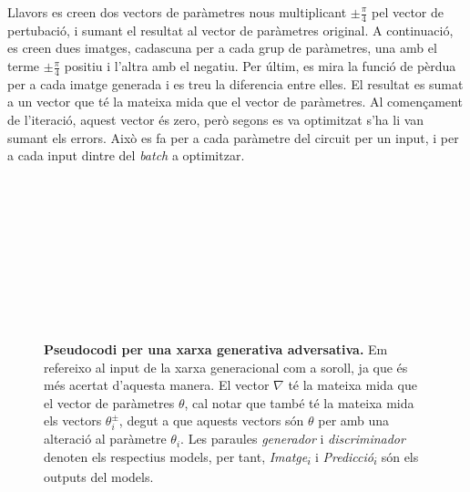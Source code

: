 Llavors es creen dos vectors de paràmetres nous multiplicant $\pm\frac{\pi}{4}$ pel vector de pertubació, i sumant el resultat al vector de paràmetres original. A continuació, es creen dues imatges, cadascuna per a cada grup de paràmetres, una amb el terme $\pm\frac{\pi}{4}$ positiu i l'altra amb el negatiu. Per últim, es mira la funció de pèrdua per a cada imatge generada i es treu la diferencia entre elles. El resultat es sumat a un vector que té la mateixa mida que el vector de paràmetres. Al començament de l'iteració, aquest vector és zero, però segons es va optimitzat s'ha li van sumant els errors. Això es fa per a cada paràmetre del circuit per un input, i per a cada input dintre del \textit{batch} a optimitzar.
\begin{figure}
	\HRule \\[-.5cm]
	\begin{algorithmic}
		 
		 
		\\
		 
		\\
		 	 
		\\
		\\
		 
		\EndFor
		\EndFor
		\\
		 
		 
		\EndFor
	\end{algorithmic}
	\HRule \\[-.4cm]
	\caption{\textbf{Pseudocodi per una xarxa generativa adversativa.} Em refereixo al input de la xarxa generacional com a soroll, ja que és més acertat d'aquesta manera. El vector $\nabla$ té la mateixa mida que el vector de paràmetres $\theta$, cal notar que també té la mateixa mida els vectors $\theta^\pm_i$, degut a que aquests vectors són $\theta$ per amb una alteració al paràmetre $\theta_i$. Les paraules \textit{generador} i \textit{discriminador} denoten els respectius models, per tant, \textit{Imatge\textsubscript{$i$}} i \textit{Predicció\textsubscript{$i$}} són els outputs del models.}
	\label{fig:alg_gen}
\end{figure}

